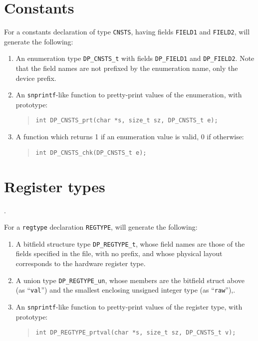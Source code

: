 \documentclass[a4paper,11pt,twoside]{report}
\begin{document}
\section{Constants}

For a constants declaration of type \texttt{CNSTS}, having fields
\texttt{FIELD1} and \texttt{FIELD2}, \Mac will generate the following:

\begin{enumerate}

\item An enumeration type \texttt{DP\_CNSTS\_t} with fields
  \texttt{DP\_FIELD1} and \texttt{DP\_FIELD2}.  Note that the field
  names are not prefixed by the enumeration name, only the device
  prefix. 

\item An \texttt{snprintf}-like function to pretty-print values of the
  enumeration, with prototype:
  \begin{quote}
    \texttt{int DP\_CNSTS\_prt(char *s, size\_t sz, DP\_CNSTS\_t e);}
  \end{quote}
      
\item A function which returns 1 if an enumeration value is valid, 0
  if otherwise:
  \begin{quote}
    \texttt{int DP\_CNSTS\_chk(DP\_CNSTS\_t e);}
  \end{quote}

\end{enumerate}

\section{Register types}\label{sec:old:c-regtype}. 

For a \texttt{regtype} declaration \texttt{REGTYPE}, \Mac will generate the following:

\begin{enumerate}

\item A bitfield structure type \texttt{DP\_REGTYPE\_t}, whose field
  names are those of the fields specified in the \Mac file, with no
  prefix, and whose physical layout corresponds to the hardware
  register type.

\item A union type \texttt{DP\_REGTYPE\_un}, whose members are the
  bitfield struct above (as ``\texttt{val}'') and the smallest
  enclosing unsigned integer type (as ``\texttt{raw}''),. 

\item An \texttt{snprintf}-like function to pretty-print values of the
  register type, with prototype:
  \begin{quote}
    \texttt{int DP\_REGTYPE\_prtval(char *s, size\_t sz, DP\_CNSTS\_t v);}
  \end{quote}

\end{enumerate}
\end{document}
